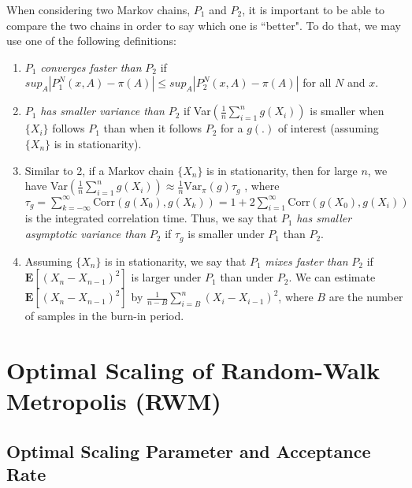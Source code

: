 \documentclass[twoside]{article}
\begin{document}
When considering two Markov chains, $P_1$ and $P_2$, it is important to be able to compare the two chains in order to say which one is ``better". To do that, we may use one of the following definitions:
\begin{enumerate}
	\item $P_1$ \textit{converges faster than} $P_2$ if $sup_A|P_1^N(x,A) -  \pi(A)| \le sup_A|P_2^N(x,A) - \pi(A)|$ for all $N$ and $x$.
	\item $P_1$ \textit{has smaller variance than} $P_2$ if Var$(\frac{1}{n}\sum_{i=1}^n g(X_i))$ is smaller when $\{X_i\}$ follows $P_1$ than when it follows $P_2$ for a $g(.)$ of interest (assuming $\{X_n\}$ is in stationarity).
	\item Similar to 2, if a Markov chain $\{X_n\}$ is in stationarity, then for large $n$, we have 
	Var$(\frac{1}{n} \sum_{i=1}^n g(X_i)) \approx \frac{1}{n}\text{Var}_{\pi}(g) \tau_g$
	, where $\tau_g = \sum_{k= -\infty}^\infty \text{Corr}(g(X_0), g(X_k)) = 1 + 2 \sum_{i=1}^{\infty} \text{Corr}(g(X_0),g(X_i))$ is the integrated correlation time. Thus, we say that $P_1$ \textit{has smaller asymptotic variance than} $P_2$ if $\tau_g$ is smaller under $P_1$ than $P_2$.
	\item Assuming $\{X_n\}$ is in stationarity, we  say that $P_1$ \textit{mixes faster than} $P_2$ if $\mathbf{E}[(X_n - X_{n-1})^2]$ is larger under $P_1$ than under $P_2$. We can estimate $\mathbf{E}[(X_n - X_{n-1})^2]$ by $\frac{1}{n-B}\sum_{i=B}^n(X_i - X_{i-1})^2$, where $B$ are the number of samples in the burn-in period.
\end{enumerate}

\section{Optimal Scaling of Random-Walk Metropolis (RWM)}

\subsection{Optimal Scaling Parameter and Acceptance Rate}
\end{document}
